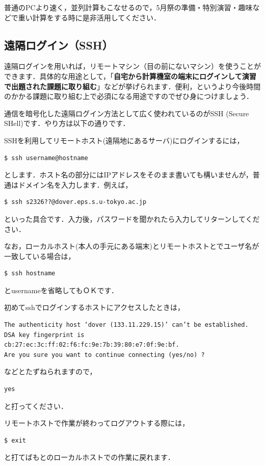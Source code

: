 \documentclass{jarticle}
\begin{document}
普通のPCより速く，並列計算もこなせるので，5月祭の準備・特別演習・趣味などで重い計算をする時に是非活用してください．


\subsection{遠隔ログイン（SSH）}
遠隔ログインを用いれば，リモートマシン（目の前にないマシン）を使うことができます．具体的な用途として，「{\bf 自宅から計算機室の端末にログインして演習で出題された課題に取り組む}」などが挙げられます．便利，というより今後時間のかかる課題に取り組む上で必須になる用途ですのでぜひ身につけましょう．
 
通信を暗号化した遠隔ログイン方法として広く使われているのがSSH  (Secure SHell)です．やり方は以下の通りです．

SSHを利用してリモートホスト(遠隔地にあるサーバ)にログインするには，
\begin{verbatim}
$ ssh username@hostname
\end{verbatim}
とします．ホスト名の部分にはIPアドレスをそのまま書いても構いませんが，普通はドメイン名を入力します．例えば，
\begin{verbatim}
$ ssh s2326??@dover.eps.s.u-tokyo.ac.jp
\end{verbatim}
といった具合です．入力後，パスワードを聞かれたら入力してリターンしてください．

なお，ローカルホスト(本人の手元にある端末)とリモートホストとでユーザ名が一致している場合は，
\begin{verbatim}
$ ssh hostname
\end{verbatim}
とusernameを省略してもＯＫです．

初めてsshでログインするホストにアクセスしたときは，
\begin{Verbatim}[baselinestretch=0.5]
The authenticity host ‘dover (133.11.229.15)’ can’t be established.
DSA key fingerprint is cb:27:ec:3c:ff:02:f6:fc:9e:7b:39:80:e7:0f:9e:bf.
Are you sure you want to continue connecting (yes/no) ?
\end{Verbatim}
などとたずねられますので，
\begin{verbatim}
yes 
\end{verbatim}
と打ってください．

リモートホストで作業が終わってログアウトする際には，
\begin{verbatim}
$ exit
\end{verbatim}
と打てばもとのローカルホストでの作業に戻れます．
\end{document}
